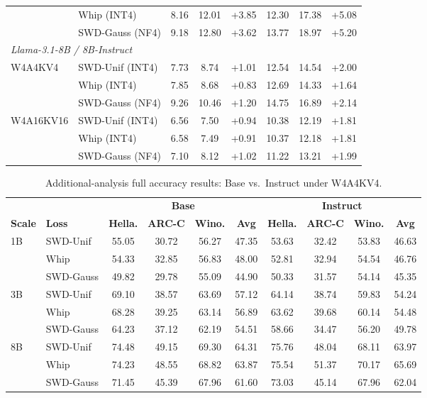 \documentclass[11pt,a4paper]{article}
\begin{document}
\begin{table}[!ht]
\begin{tabular}{ll cc c cc c}
  & Whip (INT4)       & 8.16 & 12.01 & +3.85 & 12.30 & 17.38 & +5.08 \\
  & SWD-Gauss (NF4)   & 9.18 & 12.80 & +3.62 & 13.77 & 18.97 & +5.20 \\
\midrule
\multicolumn{8}{l}{\emph{Llama-3.1-8B / 8B-Instruct}} \\
\midrule
\multirow{3}{*}{W4A4KV4}
  & SWD-Unif (INT4)  & 7.73 & 8.74 & +1.01 & 12.54 & 14.54 & +2.00 \\
  & Whip (INT4)       & 7.85 & 8.68 & +0.83 & 12.69 & 14.33 & +1.64 \\
  & SWD-Gauss (NF4)   & 9.26 & 10.46 & +1.20 & 14.75 & 16.89 & +2.14 \\
\midrule
\multirow{3}{*}{W4A16KV16}
  & SWD-Unif (INT4)  & 6.56 & 7.50 & +0.94 & 10.38 & 12.19 & +1.81 \\
  & Whip (INT4)       & 6.58 & 7.49 & +0.91 & 10.37 & 12.18 & +1.81 \\
  & SWD-Gauss (NF4)   & 7.10 & 8.12 & +1.02 & 11.22 & 13.21 & +1.99 \\
\bottomrule
\end{tabular}
\end{table}
 
\begin{table}[!ht]
\centering
\caption{Additional-analysis full accuracy results: Base vs.\ Instruct under W4A4KV4.}
\label{tab:app_exp3_acc}
\vspace{0.3em}
\footnotesize
\setlength{\tabcolsep}{4pt}
\begin{tabular}{ll cccc cccc}
\toprule
& & \multicolumn{4}{c}{\textbf{Base}} & \multicolumn{4}{c}{\textbf{Instruct}} \\
\cmidrule(lr){3-6} \cmidrule(lr){7-10}
\textbf{Scale} & \textbf{Loss} & \textbf{Hella.} & \textbf{ARC-C} & \textbf{Wino.} & \textbf{Avg} & \textbf{Hella.} & \textbf{ARC-C} & \textbf{Wino.} & \textbf{Avg} \\
\midrule
\multirow{3}{*}{1B}
  & SWD-Unif  & 55.05 & 30.72 & 56.27 & 47.35 & 53.63 & 32.42 & 53.83 & 46.63 \\
  & Whip      & 54.33 & 32.85 & 56.83 & 48.00 & 52.81 & 32.94 & 54.54 & 46.76 \\
  & SWD-Gauss & 49.82 & 29.78 & 55.09 & 44.90 & 50.33 & 31.57 & 54.14 & 45.35 \\
\midrule
\multirow{3}{*}{3B}
  & SWD-Unif  & 69.10 & 38.57 & 63.69 & 57.12 & 64.14 & 38.74 & 59.83 & 54.24 \\
  & Whip      & 68.28 & 39.25 & 63.14 & 56.89 & 63.62 & 39.68 & 60.14 & 54.48 \\
  & SWD-Gauss & 64.23 & 37.12 & 62.19 & 54.51 & 58.66 & 34.47 & 56.20 & 49.78 \\
\midrule
\multirow{3}{*}{8B}
  & SWD-Unif  & 74.48 & 49.15 & 69.30 & 64.31 & 75.76 & 48.04 & 68.11 & 63.97 \\
  & Whip      & 74.23 & 48.55 & 68.82 & 63.87 & 75.54 & 51.37 & 70.17 & 65.69 \\
  & SWD-Gauss & 71.45 & 45.39 & 67.96 & 61.60 & 73.03 & 45.14 & 67.96 & 62.04 \\
\bottomrule
\end{tabular}
\end{table}
\end{document}
